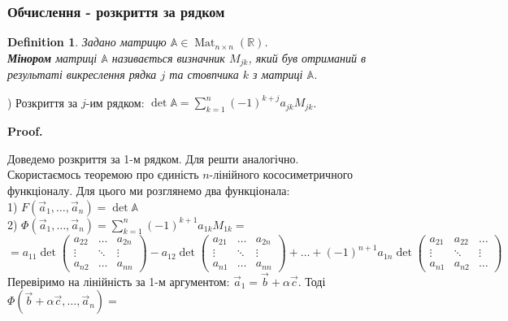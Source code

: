 \documentclass[a4paper, 10pt]{article}
\makeatletter
\theoremstyle{theoremdd}
\newtheorem{definition}[theorem]{Definition}
\DeclareMathOperator{\Mat}{Mat}
\renewenvironment{proof}[1][Proof.\\]{\par
\pushQED{\hfill \qed}%
\normalfont \topsep6\p@\@plus6\p@\relax
\trivlist
\item\relax
{\bfseries
#1\@addpunct{.}}\hspace\labelsep\ignorespaces
}{%
\popQED\endtrivlist\@endpefalse
}
\makeatother
\begin{document}
\subsubsection*{Обчислення - розкриття за рядком}
\begin{definition}
Задано матрицю $\mathbb{A} \in \Mat_{n \times n}(\mathbb{R})$.\\
\textbf{Мінором} матриці $\mathbb{A}$ називається визначник $M_{jk}$, який був отриманий в результаті викреслення рядка $j$ та стовпчика $k$ з матриці $\mathbb{A}$.
\end{definition}

) Розкриття за $j$-им рядком: $\det \mathbb{A} = \displaystyle \sum_{k=1}^n (-1)^{k+j} a_{jk}M_{jk}$.
\begin{proof}
Доведемо розкриття за 1-м рядком. Для решти аналогічно.\\
Скористаємось теоремою про єдиність $n$-лінійного кососиметричного функціоналу. Для цього ми розглянемо два функціонала:\\
1) $F(\vec{a}_1,\dots, \vec{a}_n) = \det \mathbb{A}$\\
2) $\Phi(\vec{a}_1,\dots, \vec{a}_n) = \displaystyle \sum_{k=1}^n (-1)^{k+1} a_{1k}M_{1k} =$\\
$= a_{11} \det \begin{pmatrix} a_{22} & \dots & a_{2n} \\ \vdots & \ddots & \vdots \\ a_{n2} & \dots & a_{nn} \end{pmatrix} - a_{12} \det \begin{pmatrix} a_{21} & \dots & a_{2n} \\ \vdots & \ddots & \vdots \\ a_{n1} & \dots & a_{nn} \end{pmatrix} + \dots + (-1)^{n+1} a_{1n} \det \begin{pmatrix} a_{21} & a_{22} & \dots \\ \vdots & \ddots & \vdots \\ a_{n1} & a_{n2} & \dots \end{pmatrix}$\\
Перевіримо на лінійність за 1-м аргументом: $\vec{a}_1 = \vec{b} + \alpha \vec{c}$. Тоді\\
$\Phi(\vec{b}+\alpha \vec{c},\dots,\vec{a}_n) =$ \\

\end{proof}
\end{document}
